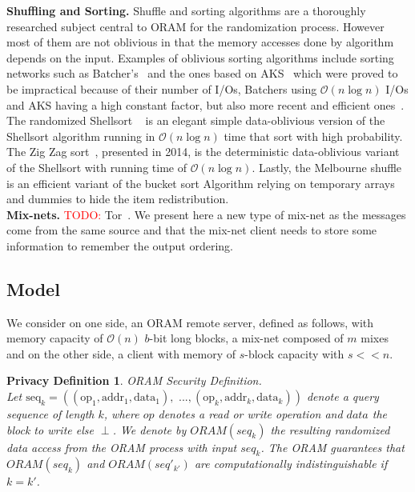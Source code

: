 \documentclass{llncs}
\newtheorem{privdef}{Privacy Definition}
\newcommand{\todo}[1]{\textcolor{red}{TODO: #1}}
\begin{document}
\noindent\textbf{Shuffling and Sorting.}
Shuffle and sorting algorithms are a thoroughly researched subject central to ORAM for the randomization process. However most of them are not oblivious in that the memory accesses done by algorithm depends on the input.
Examples of oblivious sorting algorithms include sorting networks such as Batcher's~\cite{batcher1968sorting} and the ones based on AKS~\cite{ajtai19830} which were proved to be impractical because of their number of I/Os, Batchers using $\mathcal{O}\left ( n \log n \right)$ I/Os and AKS having a high constant factor, but also more recent and efficient ones~\cite{paterson1990improved}.
The randomized Shellsort ~\cite{goodrich2010randomized} is an elegant simple data-oblivious version of the Shellsort algorithm running in $\mathcal{O}\left ( n \log n \right)$ time that sort with high probability.
The Zig Zag sort~\cite{goodrich2014zig}, presented in 2014, is the deterministic data-oblivious variant of the Shellsort with running time of $\mathcal{O}\left ( n \log n\right)$.
Lastly, the Melbourne shuffle~\cite{ohrimenko2014melbourne} is an efficient variant of the bucket sort Algorithm relying on temporary arrays and dummies to hide the item redistribution.\\

\noindent\textbf{Mix-nets.}
\todo{} Tor~\cite{dingledine2004tor}. 
We present here a new type of mix-net as the messages come from the same source and that the mix-net client needs to store some information to remember the output ordering.

\subsection{Model}
We consider on one side, an ORAM remote server, defined as follows, with memory capacity of $\mathcal{O}\left(n\right)$ $b$-bit long blocks, a mix-net composed of $m$ mixes and on the other side, a client with memory of $s$-block capacity with $s<<n$.
%
\begin{privdef}{ORAM Security Definition.}\\
Let $\text{seq}_k=((\text{op}_1, \text{addr}_1, \text{data}_1), \text{ ...},(\text{op}_k, \text{addr}_k, \text{data}_k))$ denote a query sequence of length $k$, where $op$ denotes a read or write operation and $data$ the block to write else $
\perp$.
We denote by $ORAM(seq_k)$ the resulting randomized data access from the ORAM process with input $seq_k$.
The ORAM guarantees that $ORAM(seq_k)$ and $ORAM(seq'_{k'})$ are computationally indistinguishable if $k=k'$.
\end{privdef}
\end{document}
